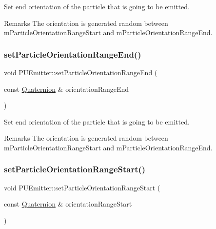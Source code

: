 Set end orientation of the particle that is going to be emitted. \begin{DoxyRemark}{Remarks}
The orientation is generated random between m\+Particle\+Orientation\+Range\+Start and m\+Particle\+Orientation\+Range\+End. 
\end{DoxyRemark}
\mbox{\label{classPUEmitter_a4268d9ade8a9ff890397a2c74b0128b8}} 
\subsubsection{\texorpdfstring{set\+Particle\+Orientation\+Range\+End()}{setParticleOrientationRangeEnd()}\hspace{0.1cm}{\footnotesize\ttfamily [2/2]}}
{\footnotesize\ttfamily void P\+U\+Emitter\+::set\+Particle\+Orientation\+Range\+End (\begin{DoxyParamCaption}\item[{const \hyperlink{classQuaternion}{Quaternion} \&}]{orientation\+Range\+End }\end{DoxyParamCaption})}

Set end orientation of the particle that is going to be emitted. \begin{DoxyRemark}{Remarks}
The orientation is generated random between m\+Particle\+Orientation\+Range\+Start and m\+Particle\+Orientation\+Range\+End. 
\end{DoxyRemark}
\mbox{\label{classPUEmitter_a1832a77324bd2c4097d29d8789b27e33}} 
\subsubsection{\texorpdfstring{set\+Particle\+Orientation\+Range\+Start()}{setParticleOrientationRangeStart()}\hspace{0.1cm}{\footnotesize\ttfamily [1/2]}}
{\footnotesize\ttfamily void P\+U\+Emitter\+::set\+Particle\+Orientation\+Range\+Start (\begin{DoxyParamCaption}\item[{const \hyperlink{classQuaternion}{Quaternion} \&}]{orientation\+Range\+Start }\end{DoxyParamCaption})}


